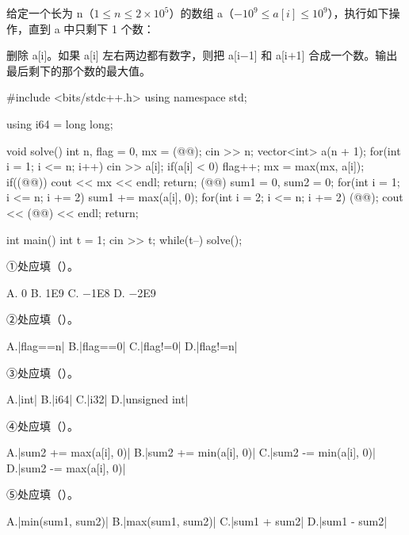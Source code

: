 \documentclass{cspexam}
\begin{document}

\hspace*{\Qindent}给定一个长为 n（\(1\le n\le 2\times10^5\)）的数组 a（\(-10^9\le a[i]\le 10^9\)），执行如下操作，直到 a 中只剩下 1 个数：

\hspace*{\Qindent}删除 a[i]。如果 a[i] 左右两边都有数字，则把 a[i$-$1] 和 a[i$+$1] 合成一个数。输出最后剩下的那个数的最大值。
\begin{ncode}
#include <bits/stdc++.h>
using namespace std;

using i64 = long long;

void solve()
{
    int n, flag = 0, mx = (@@);
    cin >> n;
    vector<int> a(n + 1);
    for(int i = 1; i <= n; i++)
    {
        cin >> a[i];
        if(a[i] < 0)
            flag++;
        mx = max(mx, a[i]);
    }
    if((@@))
    {
        cout << mx << endl;
        return;
    }
    (@@) sum1 = 0, sum2 = 0;
    for(int i = 1; i <= n; i += 2)
        sum1 += max(a[i], 0);
    for(int i = 2; i <= n; i += 2)
        (@@);
    cout << (@@) << endl;
    return;
}

int main()
{
    int t = 1;
    cin >> t;
    while(t--)
        solve();
}
\end{ncode}

\Q ①处应填（\quad）。
\begin{optrow}
\op A. 0 \op B. 1E9 \op C. $-$1E8 \op D. $-$2E9
\end{optrow}

\Q ②处应填（\quad）。
\begin{optrow}
\op A.\co|flag==n| \op B.\co|flag==0| \op C.\co|flag!=0| \op D.\co|flag!=n|
\end{optrow}

\Q ③处应填（\quad）。
\begin{optrow}
\op A.\co|int| \op B.\co|i64| \op C.\co|i32| \op D.\co|unsigned int|
\end{optrow}

\Q ④处应填（\quad）。
\begin{optgrid}
\op A.\co|sum2 += max(a[i], 0)|
\op B.\co|sum2 += min(a[i], 0)|
\op C.\co|sum2 -= min(a[i], 0)|
\op D.\co|sum2 -= max(a[i], 0)|
\end{optgrid}

\Q ⑤处应填（\quad）。
\begin{optgrid}
\op A.\co|min(sum1, sum2)|
\op B.\co|max(sum1, sum2)|
\op C.\co|sum1 + sum2|
\op D.\co|sum1 - sum2|
\end{optgrid}
\end{document}
